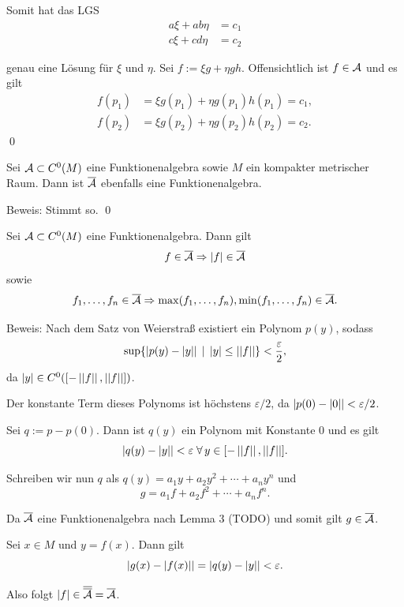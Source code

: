 \begin{frame}
    Somit hat das LGS 
    \begin{align*}
        a \xi + ab \eta &= c_1 \\
        c \xi + cd \eta &= c_2
    \end{align*}

    genau eine Lösung für \( \xi \) und \( \eta \). 
    \pause
    Sei \( f := \xi g + \eta g h \). \pause 
    Offensichtlich ist \( f \in \mathcal{A} \) \pause 
    und es gilt 
    \begin{align*}
        f(p_1) &= \xi g(p_1) + \eta g(p_1) h(p_1) = c_1, \\
        f(p_2) &= \xi g(p_2) + \eta g(p_2) h(p_2) = c_2.
    \end{align*}
    \qed
\end{frame}

\begin{frame}
    \begin{lem}
        Sei \( \mathcal{A} \subset C^0(M) \) eine Funktionenalgebra 
        sowie \(M\) ein kompakter metrischer Raum.
        Dann ist \( \overline{\mathcal{A}} \) ebenfalls eine Funktionenalgebra.
    \end{lem}
    Beweis: \pause 
    Stimmt so. \qed
\end{frame}

\begin{frame}
    \begin{lem}
        Sei \( \mathcal{A} \subset C^0(M) \) eine Funktionenalgebra. Dann gilt 
        \[ f \in \overline{\mathcal{A}} \Rightarrow \left|f\right| \in \overline{\mathcal{A}} \]
        sowie 
        \[ f_1, \ldots, f_n \in \overline{\mathcal{A}} \Rightarrow \max(f_1,\ldots, f_n), \min(f_1,\ldots, f_n) \in \overline{\mathcal{A}}. \]
    \end{lem} \pause
    Beweis:
    Nach dem Satz von Weierstraß existiert ein Polynom 
    \( p(y) \), sodass 
    \[ \sup \{ \left| p(y) - \left|y\right| \right| 
    \;|\; \left|y\right| \leq \left|\left|f\right|\right| \} < \frac{\varepsilon}{2}, \]
    da \( \left|y\right| \in C^0([-\left|\left|f\right|\right|, \left|\left|f\right|\right|]) \). 
    \pause

    Der konstante Term dieses Polynoms ist höchstens \( \varepsilon / 2 \), 
    da \( \left| p(0) - \left|0\right| \right| < \varepsilon/2 \).
\end{frame}

\begin{frame}
    Sei \( q := p - p(0) \). Dann ist \( q(y) \) ein 
    Polynom mit Konstante \(0\) und es gilt 
    \[ \abs{ q(y) - \abs{y} } < \varepsilon 
    \;\forall y \in [-\norm{f}, \norm{f}]. \]
    \pause

    Schreiben wir nun \( q \) als 
    \( q(y) = a_1 y + a_2 y^2 + \cdots + a_n y^n \) und 
    \[ g = a_1 f + a_2 f^2 + \cdots + a_n f^n. \]
    \pause

    Da \( \overline{\mathcal{A}} \) eine Funktionenalgebra nach Lemma 3 (TODO)
    und somit gilt 
    \( g \in \overline{\mathcal{A}} \). 
    \pause

    Sei \( x\in M \) und \( y = f(x) \). Dann gilt 
    \[ \left| g(x) - \left|f(x)\right| \right| = \left| q(y) - \left|y\right| \right| < \varepsilon. \]
    \pause
    
    Also folgt \( \left|f\right| \in \overline{\overline{\mathcal{A}}} = \overline{\mathcal{A}} \). 
\end{frame}

